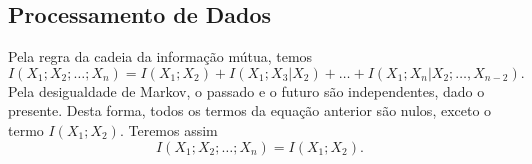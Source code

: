 \subsection{Processamento de Dados}

\begin{questions}

\begin{solution}
  Pela regra da cadeia da informação mútua, temos
  \begin{equation}
  I(X_1; X_2; \ldots; X_n) = I(X_1;X_2) + I(X_1;X_3|X_2) + \ldots + I(X_1;X_n|X_2; \ldots, X_{n-2}) .
  \end{equation}
  Pela desigualdade de Markov, o passado e o futuro são independentes, dado o presente. Desta forma,
  todos os termos da equação anterior são nulos, exceto o termo $I(X_1;X_2)$. Teremos assim
  \begin{equation}
  I(X_1; X_2; \ldots; X_n) = I(X_1;X_2) .
  \end{equation}
\end{solution}
\end{questions}
